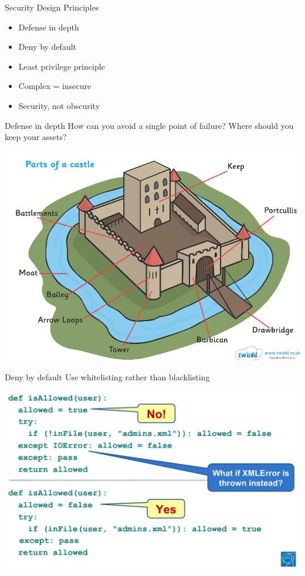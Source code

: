\documentclass{beamer}
\begin{document}
\begin{frame}{Security Design Principles}
  \begin{itemize}
    \item Defense in depth
    \item Deny by default
    \item Least privilege principle
    \item Complex = insecure
    \item Security, not obscurity
  \end{itemize}
\end{frame}

\begin{frame}{Defense in depth}
How can you avoid a single point of failure? Where should you keep your assets?
\begin{center}
\includegraphics[width=0.7\linewidth]{castle.png}
\end{center}
\end{frame}

\begin{frame}{{\color{red}Deny by default}}
Use whitelisting rather than blacklisting
\begin{center}
\includegraphics[width=0.8\linewidth]{whitelisting.png}
\end{center}
\end{frame}
\end{document}
